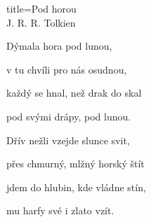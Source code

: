 \begin{song}{title=\predtitle\centering Pod horou \\\large J. R. R. Tolkien  \vspace*{-0.3cm}}
{\begin{centerjustified}
\begin{varwidth}[t]{0.41\textwidth}
\sloka
Dýmala hora pod lunou,

v tu chvíli pro nás osudnou,

každý se hnal, než drak do skal

pod svými drápy, pod lunou.

\sloka
Dřív nežli vzejde slunce svit,

přes chmurný, mlžný horský štít

jdem do hlubin, kde vládne stín,

mu harfy své i zlato vzít.

\end{varwidth}

\end{centerjustified}
}

\setcounter{Slokočet}{0}
\end{song}
